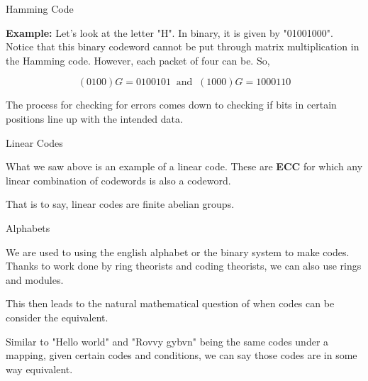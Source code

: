 \documentclass{beamer}
\begin{document}
\begin{frame}{Hamming Code}
    
    \textbf{Example:} Let's look at the letter "H". In binary, it is given by
    "01001000". Notice that this binary codeword cannot be put through matrix multiplication in the
    Hamming code. However, each packet of four can be. So,

    $$(0 1 0 0)G=0100101\;\;\text{and}\;\; (1 0 0 0)G=1000110$$

    \bigskip

    \pause

    The process for checking for errors comes down to checking if bits in certain positions line up with
    the intended data.

\end{frame}

\begin{frame}{Linear Codes}
    
    What we saw above is an example of a linear code. These are \textbf{ECC} for which any linear
    combination of codewords is also a codeword.

    \bigskip

    That is to say, linear codes are finite abelian groups.

\end{frame}

\begin{frame}{Alphabets}

    We are used to using the english alphabet or the binary system to make codes. Thanks to work done
    by ring theorists and coding theorists, we can also use rings and modules.

    \bigskip

    \pause

    This then leads to the natural mathematical question of when codes can be consider the equivalent.

    \medskip

    Similar to "Hello world" and "Rovvy gybvn" being the same codes under a mapping, given certain codes
    and conditions, we can say those codes are in some way equivalent.
    
\end{frame}
\end{document}
